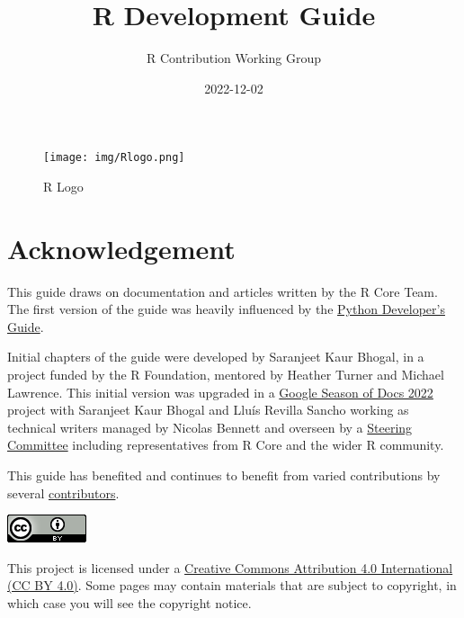 \documentclass[
]{book}
\title{R Development Guide}
\author{R Contribution Working Group}
\date{2022-12-02}
\begin{document}
\maketitle

{
\setcounter{tocdepth}{1}
\tableofcontents
}
\hypertarget{section}{%
\chapter*{}\label{section}}

\begin{figure}
\centering
\texttt{[image: img/Rlogo.png]}
\caption{R Logo}
\end{figure}

\hypertarget{acknowledgement}{%
\chapter*{Acknowledgement}\label{acknowledgement}}

This guide draws on documentation and articles written by the R Core Team. The first version of the guide was heavily influenced by the \href{https://devguide.python.org/}{Python Developer's Guide}.

Initial chapters of the guide were developed by Saranjeet Kaur Bhogal, in a project funded by the R Foundation, mentored by Heather Turner and Michael Lawrence. This initial version was upgraded in a \href{https://github.com/rstats-gsod/gsod2022/wiki/GSOD-2022-Proposal}{Google Season of Docs 2022} project with Saranjeet Kaur Bhogal and Lluís Revilla Sancho working as technical writers managed by Nicolas Bennett and overseen by a \href{https://github.com/rstats-gsod/gsod2022/wiki/GSOD-2022-Proposal\#steering-committee}{Steering Committee} including representatives from R Core and the wider R community.

This guide has benefited and continues to benefit from varied contributions by several \href{https://github.com/r-devel/rdevguide\#contributors-}{contributors}.

\href{https://creativecommons.org/licenses/by/4.0/}{\includegraphics{img/ccby.png}}

This project is licensed under a \href{https://creativecommons.org/licenses/by/4.0/}{Creative Commons Attribution 4.0 International (CC BY 4.0)}. Some pages may contain materials that are subject to copyright, in which case you will see the copyright notice.
\end{document}
